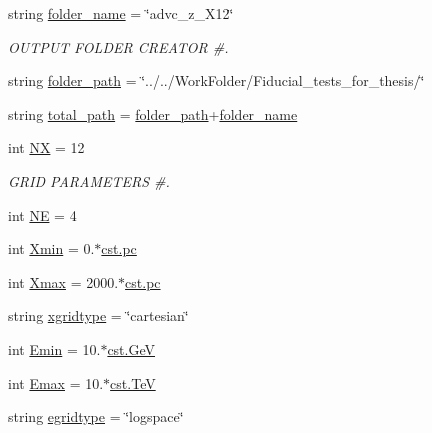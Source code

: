 \begin{DoxyCompactItemize}
\item 
string \hyperlink{namespacenamelist__adv_a5506d50276ce0fc4b64a65b8d4c74853}{folder\+\_\+name} = \char`\"{}advc\+\_\+z\+\_\+\+X12\char`\"{}
\begin{DoxyCompactList}\small\item\em O\+U\+T\+P\+UT F\+O\+L\+D\+ER C\+R\+E\+A\+T\+OR \#. \end{DoxyCompactList}\item 
string \hyperlink{namespacenamelist__adv_a160dd485bead1e603b9bd8e9f09cc90e}{folder\+\_\+path} = \char`\"{}../../Work\+Folder/Fiducial\+\_\+tests\+\_\+for\+\_\+thesis/\char`\"{}
\item 
string \hyperlink{namespacenamelist__adv_a49f409bf9910086a35e4dcb264f44d46}{total\+\_\+path} = \hyperlink{namespacenamelist__adv_a160dd485bead1e603b9bd8e9f09cc90e}{folder\+\_\+path}+\hyperlink{namespacenamelist__adv_a5506d50276ce0fc4b64a65b8d4c74853}{folder\+\_\+name}
\item 
int \hyperlink{namespacenamelist__adv_a559ae2b19144a40e1889dc2e8e3b4a77}{NX} = 12
\begin{DoxyCompactList}\small\item\em G\+R\+ID P\+A\+R\+A\+M\+E\+T\+E\+RS \#. \end{DoxyCompactList}\item 
int \hyperlink{namespacenamelist__adv_a5668c25615adb1dd63f996c9a1971e80}{NE} = 4
\item 
int \hyperlink{namespacenamelist__adv_a8fed267d735cd6b19108ee392397882e}{Xmin} = 0.$\ast$\hyperlink{constants_8h_a2884cd030c4c825754349a525a1d06ce}{cst.\+pc}
\item 
int \hyperlink{namespacenamelist__adv_a071460479279bf05f0716c7cb53a2e6e}{Xmax} = 2000.$\ast$\hyperlink{constants_8h_a2884cd030c4c825754349a525a1d06ce}{cst.\+pc}
\item 
string \hyperlink{namespacenamelist__adv_adbed4a2ce19410809e776346681e0c09}{xgridtype} = \char`\"{}cartesian\char`\"{}
\item 
int \hyperlink{namespacenamelist__adv_ae74400866e865444c31335e45a93e54d}{Emin} = 10.$\ast$\hyperlink{constants_8h_aec0e126d9991db8ad0b26139f5860568}{cst.\+GeV}
\item 
int \hyperlink{namespacenamelist__adv_a9f50ca5d1e2f2b537147f28ea52f91db}{Emax} = 10.$\ast$\hyperlink{constants_8h_a7f801e1f6821bc6baf0652ed2496e5e9}{cst.\+TeV}
\item 
string \hyperlink{namespacenamelist__adv_a47a2f058b75fa8d56c35c29994678050}{egridtype} = \char`\"{}logspace\char`\"{}

\end{DoxyCompactItemize}
